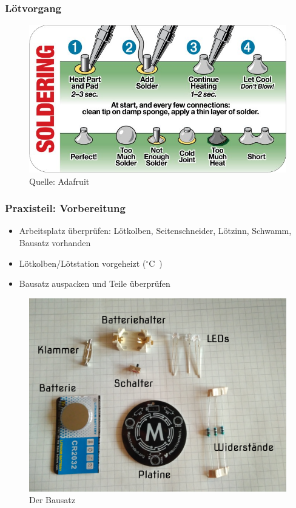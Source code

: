 \documentclass[10pt]{beamer}
\begin{document}
	\begin{frame}
	\frametitle{Lötvorgang}
	\begin{figure}[hbtp]
		\centering
		\includegraphics[width=\linewidth]{images/solder.png}
		\caption{Quelle: Adafruit}
	\end{figure}
	\end{frame}


	\begin{frame}
	\frametitle{Praxisteil: Vorbereitung}
	\begin{itemize}
		\item{Arbeitsplatz überprüfen: Lötkolben, Seitenschneider, Lötzinn, Schwamm, Bausatz vorhanden}
		\item{Lötkolben/Lötstation vorgeheizt (\unit[350]{$^\circ$C})}
		\item{Bausatz auspacken und Teile überprüfen}
	\end{itemize}
	\begin{figure}[hbtp]
		\centering
		\includegraphics[width=\linewidth*5/10]{images/badge.jpg}
		\caption{Der Bausatz}
	\end{figure}
	\end{frame}
\end{document}
